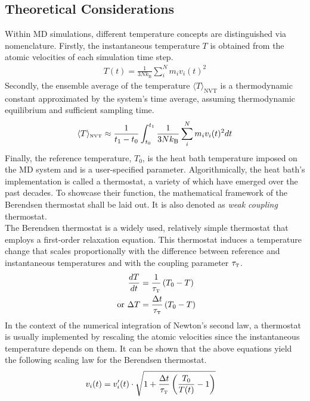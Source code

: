 \documentclass[9pt,tutorial]{livecoms}
\begin{document}
\subsection*{Theoretical Considerations}
Within MD simulations, different temperature concepts are distinguished via nomenclature. Firstly, the instantaneous temperature $T$ is obtained from the atomic velocities of each simulation time step.
\begin{align}
    T(t) = \frac{1}{3Nk_\text{B}} \sum_i^N m_i v_i(t)^2
\end{align}
Secondly, the ensemble average of the temperature $\langle T \rangle_\text{NVT}$ is a thermodynamic constant approximated by the system's time average, assuming thermodynamic equilibrium and sufficient sampling time.\cite{Coudene2016}
\begin{align}
    \langle T\rangle_\text{\tiny NVT}  \approx \frac{1}{t_1 - t_0} \int_{t_0}^{t_1} \frac{1}{3Nk_\text{B}} \sum_i^N m_i v_i(t)^2 dt
\end{align}
Finally, the reference temperature, $T_0$, is the heat bath temperature imposed on the MD system and is a user-specified parameter. Algorithmically, the heat bath's implementation is called a thermostat, a variety of which have emerged over the past decades. To showcase their function, the mathematical framework of the Berendsen thermostat\cite{Berendsen1984} shall be laid out. It is also denoted as \textit{weak coupling} thermostat.\\
The Berendsen thermostat is a widely used, relatively simple thermostat that employs a first-order relaxation equation. This thermostat induces a temperature change that scales proportionally with the difference between reference and instantaneous temperatures and with the coupling parameter $\tau_\text{\tiny T}$.
\begin{align}
    \frac{dT}{dt} & = \frac{1}{\tau_\text{\tiny T}}\left(T_0 - T \right) \\
   \text{ or } \Delta T & = \frac{\Delta t}{\tau_\text{\tiny T}}\left(T_0 - T \right) 
\end{align}
In the context of the numerical integration of Newton's second law, a thermostat is usually implemented by rescaling the atomic velocities since the instantaneous temperature depends on them. It can be shown that the above equations yield the following scaling law for the Berendsen thermostat.\cite{Hnenberger2005}
\begin{align}
    v_i(t) & = v_i^\prime (t) \cdot \sqrt{1 + \frac{\Delta t}{\tau_\text{\tiny T}}\left( \frac{T_0}{T(t)} - 1\right)}
\end{align}
\end{document}
